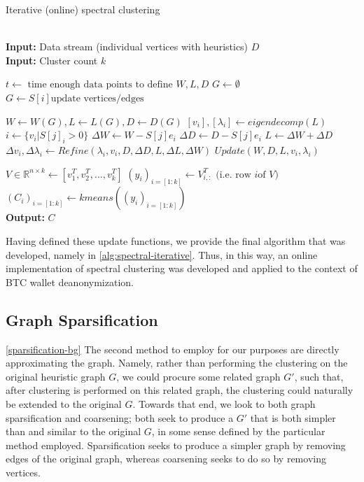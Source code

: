 \documentclass{article}
\begin{document}
\begin{algorithm}
\caption{Iterative (online) spectral clustering \cite{incremental}}\label{alg:spectral-iterative}
\begin{algorithmic}[1]
 \\
\textbf{Input:} Data stream (individual vertices with heuristics) $D$ \\
\textbf{Input:} Cluster count $k$

\State $t \gets\text{ time enough data points to define } W, L, D$
\State $G \gets \emptyset$
    \State $G \gets S[i] \text{update vertices/edges}$
\EndFor

\State $W\gets W(G), L\gets L(G), D\gets D(G)$
\State $[v_i], [\lambda_i] \gets eigendecomp(L)$
    \State $i \gets \{v_i|S[j]_i > 0\}$
    \State $\Delta W\gets W - S[j] e_i$
    \State $\Delta D\gets D - S[j] e_i$
    \State $L\gets \Delta W + \Delta D$
    \State $\Delta v_i, \Delta \lambda_i \gets Refine(\lambda_i, v_i, D, \Delta D, L, \Delta L, \Delta W)$
    \State $Update(W,D,L,v_i,\lambda_i)$
\EndWhile

\State $V\in\mathbb{R}^{n\times k} \gets [v_1^T, v_2^T,\dots,v_k^T]$
\State $(y_i)_{i=[1:k]} \gets V^T_{i,:} \text{ (i.e. row } i \text{of } V\text{)}$
\State $(C_i)_{i=[1:k]} \gets kmeans((y_i)_{i=[1:k]})$ \\

\textbf{Output:} $C$
\EndProcedure
\end{algorithmic}
\end{algorithm}

Having defined these update functions, we provide the final algorithm that was developed, namely in \ref{alg:spectral-iterative}. Thus, in this way, an online implementation of spectral clustering was developed and applied to the context of BTC wallet deanonymization.

\subsection{Graph Sparsification}\ref{sparsification-bg}
The second method to employ for our purposes are directly approximating the graph. Namely, rather than performing the clustering on the original heuristic graph $G$, we could procure some related graph $G'$, such that, after clustering is performed on this related graph, the clustering could naturally be extended to the original $G$. Towards that end, we look to both graph sparsification and coarsening; both seek to produce a $G'$ that is both simpler than and similar to the original $G$, in some sense defined by the particular method employed. Sparsification seeks to produce a simpler graph by removing edges of the original graph, whereas coarsening seeks to do so by removing vertices.
\end{document}
